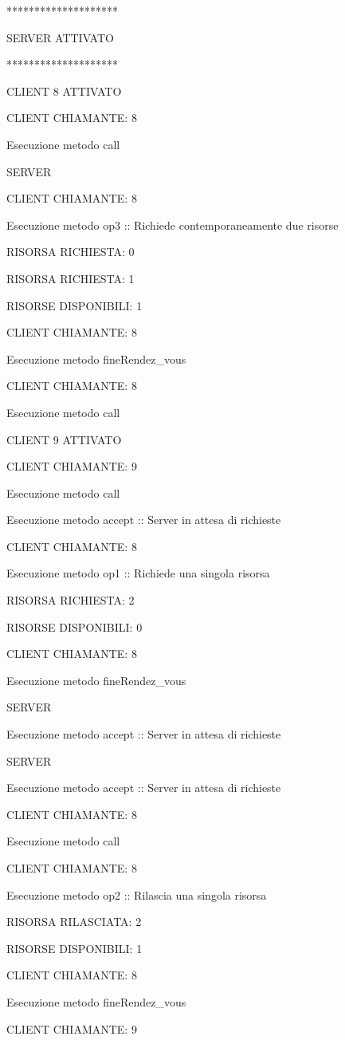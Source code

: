 \documentclass[10pt, a4paper]{article}
\begin{document}
********************

SERVER ATTIVATO

********************

CLIENT 8 ATTIVATO

CLIENT CHIAMANTE: 8

Esecuzione metodo call

SERVER

CLIENT CHIAMANTE: 8

Esecuzione metodo op3 :: Richiede contemporaneamente due risorse

RISORSA RICHIESTA: 0

RISORSA RICHIESTA: 1

RISORSE DISPONIBILI: 1

CLIENT CHIAMANTE: 8

Esecuzione metodo fineRendez\_vous

CLIENT CHIAMANTE: 8

Esecuzione metodo call

CLIENT 9 ATTIVATO

CLIENT CHIAMANTE: 9

Esecuzione metodo call

Esecuzione metodo accept :: Server in attesa di richieste

CLIENT CHIAMANTE: 8

Esecuzione metodo op1 :: Richiede una singola risorsa

RISORSA RICHIESTA: 2

RISORSE DISPONIBILI: 0

CLIENT CHIAMANTE: 8

Esecuzione metodo fineRendez\_vous

SERVER

Esecuzione metodo accept :: Server in attesa di richieste

SERVER

Esecuzione metodo accept :: Server in attesa di richieste

CLIENT CHIAMANTE: 8

Esecuzione metodo call

CLIENT CHIAMANTE: 8

Esecuzione metodo op2 :: Rilascia una singola risorsa

RISORSA RILASCIATA: 2

RISORSE DISPONIBILI: 1

CLIENT CHIAMANTE: 8

Esecuzione metodo fineRendez\_vous

CLIENT CHIAMANTE: 9
\end{document}
